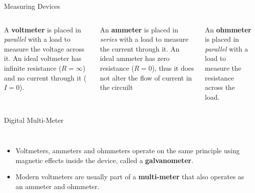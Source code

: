 \documentclass[12pt,aspectratio=169]{beamer}
\begin{document}
\begin{frame}{Measuring Devices}
  \begin{columns}[T]
    
    A \textbf{voltmeter} is placed in \emph{parallel} with a load to measure
    the voltage across it. An ideal voltmeter has infinite resistance
    ($R=\infty$) and no current through it ($I=0$).

    
    \vspace{.47in}An \textbf{ammeter} is placed in \emph{series} with a load to
    measure the current through it. An ideal ammeter has zero resistance
    ($R=0$), thus it does not alter the flow of current in the circuilt

    
    An \textbf{ohmmeter} is placed in \emph{parallel} with a load to measure
    the resistance across the load.
  \end{columns}
\end{frame}



\begin{frame}{Digital Multi-Meter}
  \begin{columns}

    \begin{itemize}
    \item Voltmeters, ammeters and ohmmeters operate on the same principle
      using magnetic effects inside the device, called a \textbf{galvanometer}.
    \item Modern voltmeters are usually part of a \textbf{multi-meter} that
      also operates as an ammeter and ohmmeter.
    \end{itemize}
  \end{columns}
\end{frame}
\end{document}
